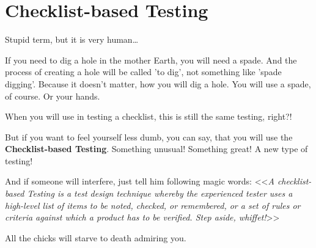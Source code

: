 \section{Checklist-based Testing}
\label{sec:Checklist-based Testing}

Stupid term, but it is very human\ldots

If you need to dig a hole in the mother Earth, you will need a spade. And the process of creating a hole will be called 'to dig', not something like 'spade digging'. Because it doesn't matter, how you will dig a hole. You will use a spade, of course. Or your hands.

When you will use in testing a checklist, this is still the same testing, right?!

But if you want to feel yourself less dumb, you can say, that you will use the \textbf{Checklist-based Testing}. Something unusual! Something great! A new type of testing!

And if someone will interfere, just tell him following magic words: <<\textit{A checklist-based Testing is a test design technique whereby the experienced tester uses a high-level list of items to be noted, checked, or remembered, or a set of rules or criteria against which a product has to be verified. Step aside, whiffet!}>>

All the chicks will starve to death admiring you.